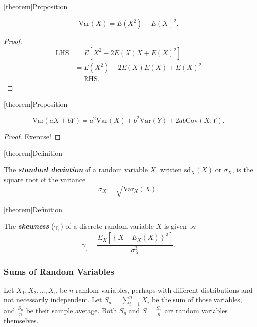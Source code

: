 \documentclass[12pt]{report}
\theoremstyle{definition}
\begin{document}
[theorem]{Proposition}
\begin{variance alternate form}
    \[
        \text{Var}(X)=E(X^{2})-E(X)^{2}.  
    \]
\end{variance alternate form}
\begin{proof}
    \begin{align*}
        \text{LHS} & = E\left[X^{2}-2E(X)X+E(X)^{2}\right] \\
                   & = E(X^{2})-2E(X)E(X)+E(X)^{2} \\
                   & = \text{RHS}.
    \end{align*} 
\end{proof} 

[theorem]{Proposition}
\begin{variance of sum of two RV}
    \[
        \text{Var}(aX\pm bY) = a^{2}\text{Var}(X)
        + b^{2}\text{Var}(Y) \pm 2ab\text{Cov}(X,Y).
    \]
\end{variance of sum of two RV}
\begin{proof}
    Exercise!
\end{proof} 

[theorem]{Definition}
\begin{standard deviation}
    The \textbf{\emph{standard deviation}} of a random variable $X$, written
    $\text{sd}_X(X)$ or $\sigma_X$, is the square root of the variance,
    \[
        \sigma_X = \sqrt{\text{Var}_X(X)}.
    \]
\end{standard deviation}

[theorem]{Definition}
\begin{skewness of discrete RV}
    The \textbf{\emph{skewness}} ($\gamma_1$) of a discrete random variable $X$
    is given by
    \[
        \gamma_1=\frac{E_X\left[{\left\{X-E_X(X)\right\}}^{3}\right]}{\sigma_X^{3}}.
    \]
\end{skewness of discrete RV}

\subsubsection{Sums of Random Variables}

Let $X_1,X_2,\ldots,X_n$ be $n$ random variables, perhaps with different
distributions and not necessarily independent. Let $S_n=\sum_{i=1}^{n} X_i$ be
the sum of those variables, and $\frac{S_n}{n}$ be their sample average. Both
$S_n$ and $\overline{S}=\frac{S_n}{n}$ are random variables themselves.
\end{document}

